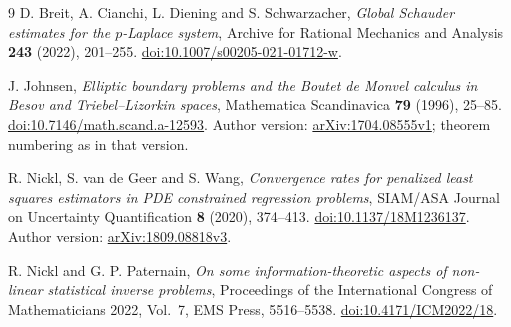 \documentclass[11pt]{article}
\theoremstyle{remark}
\begin{document}
\begin{thebibliography}{9}
D. Breit, A. Cianchi, L. Diening and S. Schwarzacher,
\emph{Global Schauder estimates for the $p$-Laplace system},
Archive for Rational Mechanics and Analysis \textbf{243} (2022), 201--255.
\href{https://doi.org/10.1007/s00205-021-01712-w}{doi:10.1007/s00205-021-01712-w}.

J. Johnsen,
\emph{Elliptic boundary problems and the Boutet de Monvel calculus in Besov and Triebel--Lizorkin spaces},
Mathematica Scandinavica \textbf{79} (1996), 25--85.
\href{https://doi.org/10.7146/math.scand.a-12593}{doi:10.7146/math.scand.a-12593}.
Author version: \href{https://arxiv.org/abs/1704.08555v1}{arXiv:1704.08555v1}; theorem numbering as in that version.

R. Nickl, S. van de Geer and S. Wang,
\emph{Convergence rates for penalized least squares estimators in PDE constrained regression problems},
SIAM/ASA Journal on Uncertainty Quantification \textbf{8} (2020), 374--413.
\href{https://doi.org/10.1137/18M1236137}{doi:10.1137/18M1236137}.
Author version: \href{https://arxiv.org/abs/1809.08818v3}{arXiv:1809.08818v3}.

R. Nickl and G. P. Paternain,
\emph{On some information-theoretic aspects of non-linear statistical inverse problems},
Proceedings of the International Congress of Mathematicians 2022, Vol.~7,
EMS Press, 5516--5538.
\href{https://doi.org/10.4171/ICM2022/18}{doi:10.4171/ICM2022/18}.
\end{thebibliography}
\end{document}
